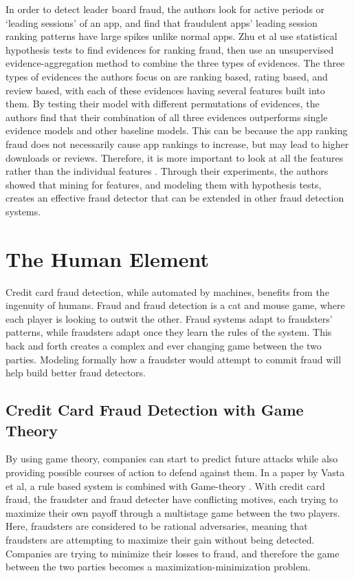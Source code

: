 \documentclass[midd]{thesis}
\begin{document}
In order to detect leader board fraud, the authors look for active periods or `leading sessions' of an app, and find that fraudulent apps' leading session ranking patterns have large spikes unlike normal apps. Zhu et al use statistical hypothesis tests to find evidences for ranking fraud, then use an unsupervised evidence-aggregation method to combine the three types of evidences. The three types of evidences the authors focus on are ranking based, rating based, and review based, with each of these evidences having several features built into them. By testing their model with different permutations of evidences, the authors find that their combination of all three evidences outperforms single evidence models and other baseline models. This can be because the app ranking fraud does not necessarily cause app rankings to increase, but may lead to higher downloads or reviews. Therefore, it is more important to look at all the features rather than the individual features \cite{Zhu2015}. Through their experiments, the authors showed that mining for features, and modeling them with hypothesis tests, creates an effective fraud detector that can be extended in other fraud detection systems. 


\section{The Human Element}

Credit card fraud detection, while automated by machines, benefits from the ingenuity of humans. Fraud and fraud detection is a cat and mouse game, where each player is looking to outwit the other. Fraud systems adapt to fraudsters' patterns, while fraudsters adapt once they learn the rules of the system. This back and forth creates a complex and ever changing game between the two parties. Modeling formally how a fraudster would attempt to commit fraud will help build better fraud detectors.

\subsection{Credit Card Fraud Detection with Game Theory}

 
By using game theory, companies can start to predict future attacks while also providing possible courses of action to defend against them. In a paper by Vasta et al, a rule based system is combined with Game-theory \cite{Vatsa2007}. With credit card fraud, the fraudster and fraud detecter have conflicting motives, each trying to maximize their own payoff through a multistage game between the two players. Here, fraudsters are considered to be rational adversaries, meaning that fraudsters are attempting to maximize their gain without being detected. Companies are trying to minimize their losses to fraud, and therefore the game between the two parties becomes a maximization-minimization problem. 
 
\end{document}
